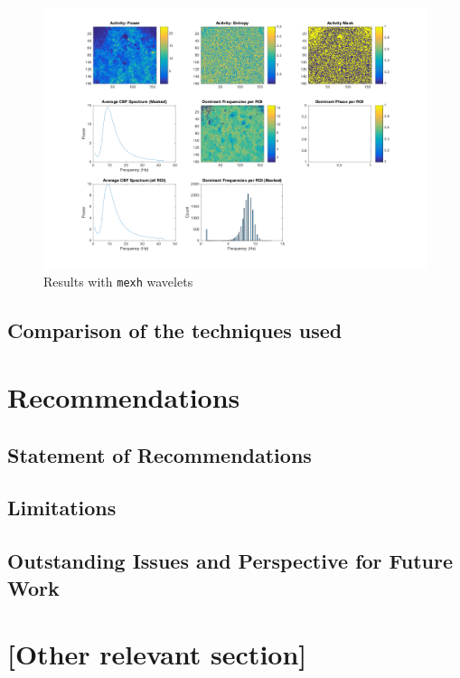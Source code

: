 \documentclass[11pt]{scrartcl}
\begin{document}
\begin{figure}[h]
  \centering
  \includegraphics[scale=0.5]{Cylia_beating_movie_mexh_mat_Results.png}
  \caption{Results with \texttt{mexh} wavelets}
  \label{fig:mexh}
\end{figure}

\subsection{Comparison of the techniques used}
\label{sec:comp-techn-used}



\section{Recommendations}


\subsection{Statement of Recommendations}


\subsection{Limitations}


\subsection{Outstanding Issues and Perspective for Future Work}




\section{[Other relevant section]}








\end{document}

